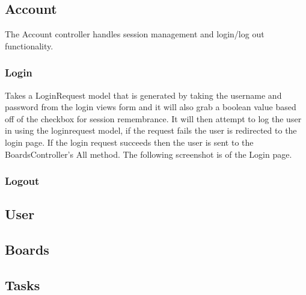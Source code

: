 \documentclass[letterpaper]{article}
\begin{document}
\subsection{Account}
The Account controller handles session management and login/log out functionality.

\subsubsection{Login}
Takes a LoginRequest model that is generated by taking the username and password from the login views form and it will also grab a boolean value based off of the checkbox for session remembrance. It will then attempt to log the user in using the loginrequest model, if the request fails the user is redirected to the login page. If the login request succeeds then the user is sent to the BoardsController's All method. The following screenshot is of the Login page.




\subsubsection{Logout}

\subsection{User}

\subsection{Boards}

\subsection{Tasks}







\pagebreak
\end{document}
